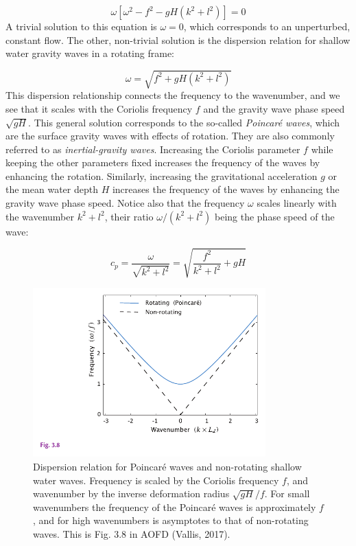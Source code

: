 \documentclass[12pt]{article}
\numberwithin{equation}{section}
\numberwithin{figure}{section}
\numberwithin{table}{section}
\begin{document}
\begin{equation}
  \omega[\omega^2 - f^2 - gH(k^2 + l^2)] = 0
  \label{eq:swe_determinant}
\end{equation}
A trivial solution to this equation is $\omega = 0$, which corresponds to an
unperturbed, constant flow.
The other, non-trivial solution is the dispersion relation for shallow water
gravity waves in a rotating frame:

\begin{equation}
  \omega = \sqrt{f^2 + gH(k^2 + l^2)}
  \label{eq:swe_dispersion}
\end{equation}
This dispersion relationship connects the frequency to the wavenumber, and we
see that it scales with the Coriolis frequency $f$ and the gravity wave
phase speed $\sqrt{gH}$.
This general solution corresponds to the so-called
\textit{Poincaré waves}, which are the surface gravity
waves with effects of rotation.
They are also commonly referred to as
\textit{inertial-gravity waves}.
Increasing the Coriolis parameter $f$ while keeping the other parameters fixed
increases the frequency of the waves by enhancing the rotation.
Similarly, increasing the gravitational acceleration $g$ or the mean water depth
$H$ increases the frequency of the waves by enhancing the gravity wave phase
speed.
Notice also that the frequency $\omega$ scales linearly with the wavenumber
$k^2 + l^2$, their ratio $\omega / (k^2 + l^2)$ being the phase speed of the
wave:

\begin{equation}
  c_p = \frac{\omega}{\sqrt{k^2 + l^2}} = \sqrt{\frac{f^2}{k^2 + l^2} + gH}
\end{equation}

\begin{figure}[h]
  \centering
  \includegraphics[width=0.8\textwidth]{assets/fig_swe_dispersion.pdf}
  \caption{
    Dispersion relation for Poincaré waves and non-rotating shallow water
    waves.
    Frequency is scaled by the Coriolis frequency $f$, and wavenumber by the
    inverse deformation radius $\sqrt{gH}/f$.
    For small wavenumbers the frequency of the Poincaré waves is approximately
    $f$, and for high wavenumbers is asymptotes to that of non-rotating waves.
    This is Fig. 3.8 in AOFD (Vallis, 2017).
  }
  \label{fig:swe_dispersion}
\end{figure}
\end{document}
